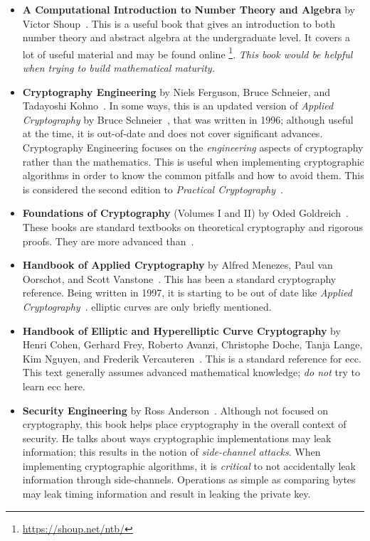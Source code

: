 \begin{itemize}
\item \textbf{A Computational Introduction to Number Theory and Algebra}
    by Victor Shoup~\cite{ComputationalIntroNTA}.
    This is a useful book that gives an introduction to both
    \gls{number theory} and abstract algebra at the undergraduate level.
    It covers a lot of useful material and may be found online%
    \footnote{\url{https://shoup.net/ntb/}}.
    \emph{This book would be helpful when trying to build
    mathematical maturity.}
\item \textbf{Cryptography Engineering}
    by Niels Ferguson, Bruce Schneier, and Tadayoshi Koh\-no~\cite{CryptoEng}.
    In some ways, this is an updated version of \emph{Applied Cryptography}
    by Bruce Schneier~\cite{AppliedCrypto},
    that was written in 1996;
    although useful at the time, it is out-of-date and does not cover
    significant advances.
    Cryptography Engineering focuses on the \emph{engineering}
    aspects of cryptography rather than the mathematics.
    This is useful when implementing cryptographic algorithms in order
    to know the common pitfalls and how to avoid them.
    This is considered the second edition to
    \emph{Practical Cryptography}~\cite{PracticalCryptography}.
\item \textbf{Foundations of Cryptography} (Volumes I and II)
    by Oded Goldreich~\cite{FoundationsCrypto1,FoundationsCrypto2}.
    These books are standard textbooks on theoretical cryptography
    and rigorous proofs.
    They are more advanced than~\cite{IntroModernCrypto}.
\item \textbf{Handbook of Applied Cryptography}
    by Alfred Menezes, Paul van Oorschot,
    and Scott Vanstone~\cite{HandbookAppliedCrypto}.
    This has been a standard cryptography reference.
    Being written in 1997, it is starting to be out of date
    like \emph{Applied Cryptography}~\cite{AppliedCrypto}.
    \Glspl{elliptic curve} are only briefly mentioned.
\item \textbf{Handbook of Elliptic and Hyperelliptic Curve Cryptography}
    by Henri Cohen, Gerhard Frey, Roberto Avanzi, Christophe Doche,
    Tanja Lange, Kim Nguyen, and Frederik Vercauteren~\cite{HandbookECC}.
    This is a standard reference for \gls{ecc}.
    This text generally assumes advanced mathematical knowledge;
    \emph{do not} try to learn \gls{ecc} here.
\item \textbf{Security Engineering} by Ross Anderson~\cite{SecurityEng}.
    Although not focused on cryptography,
    this book helps place cryptography in the overall context of security.
    He talks about ways cryptographic implementations may leak information;
    this results in the notion of \emph{side-channel attacks}.
    When implementing cryptographic algorithms,
    it is \emph{critical} to not accidentally leak information
    through side-channels.
    Operations as simple as comparing bytes may leak timing information
    and result in leaking the private key.
\end{itemize}

